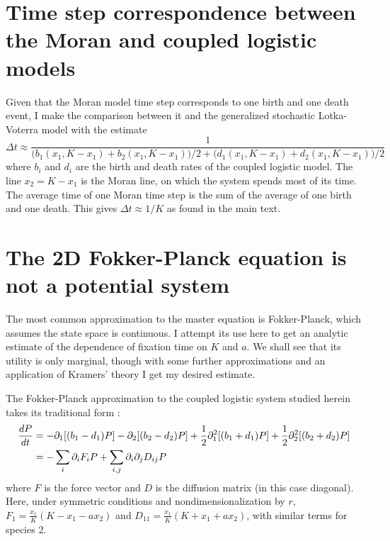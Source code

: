 

\section*{Time step correspondence between the Moran and coupled logistic models}%
Given that the Moran model time step corresponds to one birth and one death event, I make the comparison between it and the generalized stochastic Lotka-Voterra model with the estimate 
\begin{equation}
\Delta t \approx \frac{1}{\big(b_1\left(x_1,K-x_1\right)+b_2\left(x_1,K-x_1\right)\big)/2+\big(d_1\left(x_1,K-x_1\right)+d_2\left(x_1,K-x_1\right)\big)/2}
\end{equation}
where $b_i$ and $d_i$ are the birth and death rates of the coupled logistic model. 
The line $x_2=K-x_1$ is the Moran line, on which the system spends most of its time. 
The average time of one Moran time step is the sum of the average of one birth and one death. 
This gives $\Delta t \approx 1/K$ as found in the main text. 


\section*{The 2D Fokker-Planck equation is not a potential system}
The most common approximation to the master equation is Fokker-Planck, which assumes the state space is continuous. 
I attempt its use here to get an analytic estimate of the dependence of fixation time on $K$ and $a$. 
We shall see that its utility is only marginal, though with some further approximations and an application of Kramers' theory I get my desired estimate. 

The Fokker-Planck approximation to the coupled logistic system studied herein takes its traditional form \cite{Nisbet1982}:
\begin{align}
\frac{dP}{dt} &= - \partial_1[(b_1-d_1)P] - \partial_2[(b_2-d_2)P] + \frac{1}{2}\partial_1^2[(b_1+d_1)P] + \frac{1}{2}\partial_2^2[(b_2+d_2)P] \notag \\
&= -\sum_{i} \partial_i F_iP + \sum_{i,j} \partial_i\partial_j D_{ij}P
\end{align}%
where $F$ is the force vector and $D$ is the diffusion matrix (in this case diagonal). 
Here, under symmetric conditions and nondimensionalization by $r$, $F_1 = \frac{x_1}{K}(K - x_1 - a x_2)$ and $D_{11} = \frac{x_1}{K}(K + x_1 + a x_2)$, with similar terms for species 2. 

